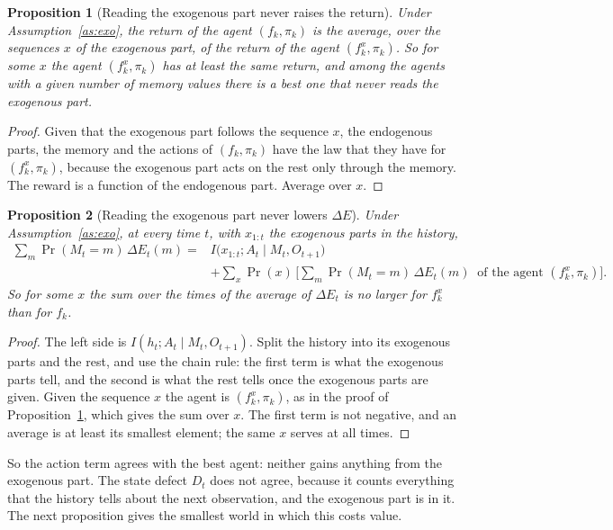 \documentclass[11pt]{article}
\newtheorem{proposition}{Proposition}
\theoremstyle{definition}
\newcommand{\dE}{\Delta E}
\begin{document}
\begin{proposition}[Reading the exogenous part never raises the return]\label{prop:exoJ}
Under Assumption~\ref{as:exo}, the return of the agent $(f_k,\pi_k)$ is the average, over the sequences $x$ of the exogenous part, of the return of the agent $(f_k^{x},\pi_k)$. So for some $x$ the agent $(f_k^{x},\pi_k)$ has at least the same return, and among the agents with a given number of memory values there is a best one that never reads the exogenous part.
\end{proposition}
\begin{proof}
Given that the exogenous part follows the sequence $x$, the endogenous parts, the memory and the actions of $(f_k,\pi_k)$ have the law that they have for $(f_k^{x},\pi_k)$, because the exogenous part acts on the rest only through the memory. The reward is a function of the endogenous part. Average over $x$.
\end{proof}

\begin{proposition}[Reading the exogenous part never lowers $\dE$]\label{prop:exoE}
Under Assumption~\ref{as:exo}, at every time $t$, with $x_{1:t}$ the exogenous parts in the history,
\begin{align*}
\sum_m\Pr(M_t=m)\,\dE_t(m)={}&I\big(x_{1:t};A_t\mid M_t,O_{t+1}\big)\\
&+\sum_x\Pr(x)\,\Big[\sum_m\Pr(M_t=m)\,\dE_t(m)\ \text{ of the agent }(f_k^{x},\pi_k)\Big].
\end{align*}
So for some $x$ the sum over the times of the average of $\dE_t$ is no larger for $f_k^{x}$ than for $f_k$.
\end{proposition}
\begin{proof}
The left side is $I(h_t;A_t\mid M_t,O_{t+1})$. Split the history into its exogenous parts and the rest, and use the chain rule: the first term is what the exogenous parts tell, and the second is what the rest tells once the exogenous parts are given. Given the sequence $x$ the agent is $(f_k^{x},\pi_k)$, as in the proof of Proposition~\ref{prop:exoJ}, which gives the sum over $x$. The first term is not negative, and an average is at least its smallest element; the same $x$ serves at all times.
\end{proof}

So the action term agrees with the best agent: neither gains anything from the exogenous part. The state defect $D_t$ does not agree, because it counts everything that the history tells about the next observation, and the exogenous part is in it. The next proposition gives the smallest world in which this costs value.
\end{document}
